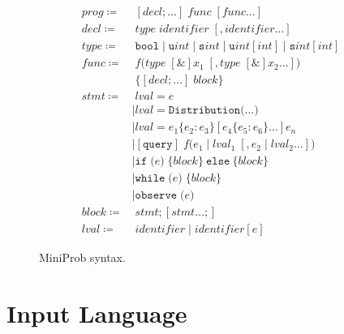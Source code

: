 \documentclass[9pt,a4paper]{article}
\begin{document}
\begin{figure}
\begin{align*}
\mathit{prog} \coloneqq & \; [\mathit{decl} ; \dots] \; \mathit{func} \; [\mathit{func} \dots] \\
\mathit{decl} \coloneqq & \; \mathit{type \; identifier} \; [, \mathit{identifier} \dots] \\
\mathit{type} \coloneqq & \; \mathtt{bool} \mid \mathtt{u}\mathit{int} \mid \mathtt{s}\mathit{int} \mid \mathtt{u}\mathit{int}[\mathit{int}] \mid \mathtt{s}\mathit{int}[\mathit{int}] \\
\mathit{func} \coloneqq & \; f \texttt{(}\mathit{type} \; [\&] x_1 \; [, \mathit{type} \; [\&] x_2 \dots]\texttt{)} \\
  &\; \{ [\mathit{decl} ; \dots] \; \mathit{block} \} \\
\mathit{stmt} \coloneqq
    & \; \mathit{lval} = e \\
    &\mid \mathit{lval} = \mathtt{Distribution}\texttt{(} \dots \texttt{)} \\
    &\mid \mathit{lval} = e_1 \{ e_2 : e_3 \} [e_4 \{ e_5 : e_6 \} \dots] e_n \\
    &\mid [\texttt{query}] \; f\texttt{(}e_1 \mid \mathit{lval}_1 \; [, e_2 \mid \mathit{lval}_2 \dots]\texttt{)} \\
    &\mid \mathtt{if} \; \texttt{(}e\texttt{)} \; \{ \mathit{block} \} \ \mathtt{else} \ \{ \mathit{block} \} \\
    &\mid \mathtt{while} \; \texttt{(}e\texttt{)} \; \{ \mathit{block} \} \\
    &\mid \mathtt{observe} \; \texttt{(}e\texttt{)} \\
\mathit{block} \coloneqq & \; \mathit{stmt} ; [\mathit{stmt} \dots ; ] \\
\mathit{lval} \coloneqq & \; \mathit{identifier} \mid \mathit{identifier}[e]
\end{align*}
\caption{MiniProb syntax.}
\label{fig:miniprob}
\end{figure}

\section{Input Language}
\label{sec:format}
\end{document}
